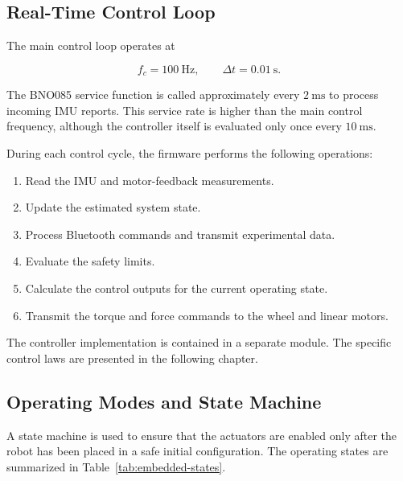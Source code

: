 \subsection{Real-Time Control Loop}

The main control loop operates at

\begin{equation}
f_c=100~\mathrm{Hz},
\qquad
\Delta t=0.01~\mathrm{s}.
\end{equation}

The BNO085 service function is called approximately every $2~\mathrm{ms}$ to process incoming IMU reports. This service rate is higher than the main control frequency, although the controller itself is evaluated only once every $10~\mathrm{ms}$.

During each control cycle, the firmware performs the following operations:

\begin{enumerate}
    \item Read the IMU and motor-feedback measurements.
    \item Update the estimated system state.
    \item Process Bluetooth commands and transmit experimental data.
    \item Evaluate the safety limits.
    \item Calculate the control outputs for the current operating state.
    \item Transmit the torque and force commands to the wheel and linear motors.
\end{enumerate}

The controller implementation is contained in a separate module. The specific control laws are presented in the following chapter.

\subsection{Operating Modes and State Machine}

A state machine is used to ensure that the actuators are enabled only after the robot has been placed in a safe initial configuration. The operating states are summarized in Table~\ref{tab:embedded-states}.

